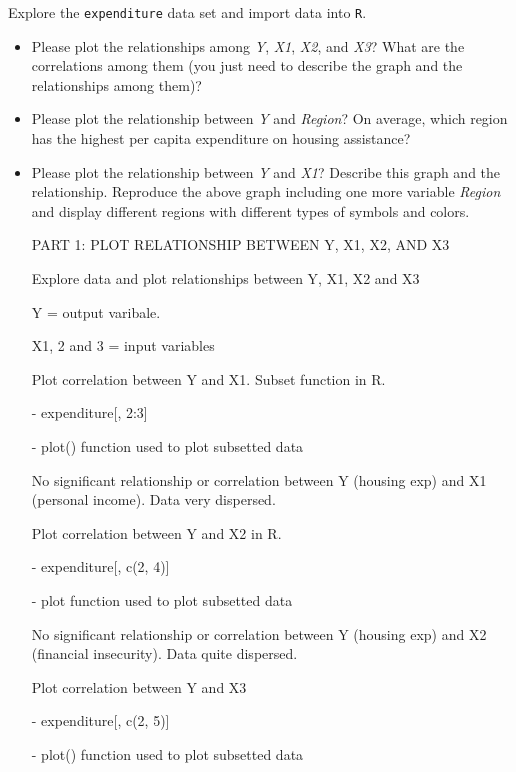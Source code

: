 \documentclass[12pt,letterpaper]{article}
\begin{document}
\vspace{.5cm}
\noindent Explore the \texttt{expenditure} data set and import data into \texttt{R}.
\vspace{.5cm}
  
\vspace{.5cm}
\begin{itemize}

\item
Please plot the relationships among \emph{Y}, \emph{X1}, \emph{X2}, and \emph{X3}? What are the correlations among them (you just need to describe the graph and the relationships among them)?
\vspace{.5cm}
\item
Please plot the relationship between \emph{Y} and \emph{Region}? On average, which region has the highest per capita expenditure on housing assistance?
\vspace{.5cm}
\item
Please plot the relationship between \emph{Y} and \emph{X1}? Describe this graph and the relationship. Reproduce the above graph including one more variable \emph{Region} and display different regions with different types of symbols and colors.

PART 1: PLOT RELATIONSHIP BETWEEN Y, X1, X2, AND X3

Explore data and plot relationships between Y, X1, X2 and X3

Y = output varibale. 

X1, 2 and 3 = input variables


Plot correlation between Y and X1. Subset function in R.

- expenditure[, 2:3]

- plot() function used to plot subsetted data

 No significant relationship or correlation between Y (housing exp) and X1 (personal income). Data very dispersed. 

Plot correlation between Y and X2 in R.

- expenditure[, c(2, 4)]

- plot function used to plot subsetted data

No significant relationship or correlation between Y (housing exp) and X2 (financial insecurity). Data quite dispersed. 

Plot correlation between Y and X3

- expenditure[, c(2, 5)]

- plot() function used to plot subsetted data 


\end{itemize}
\end{document}
